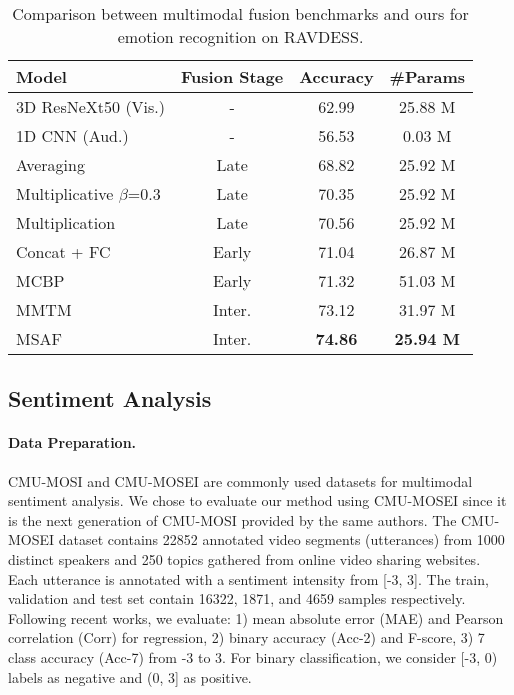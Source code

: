 \documentclass[10pt,twocolumn,letterpaper]{article}
\begin{document}
\begin{table}[t]
  \centering
  \small
    \begin{tabular}{lccc} Model & Fusion Stage & Accuracy & \#Params\\
      \hline
      3D ResNeXt50 (Vis.) & - & 62.99 & 25.88 M\\
      1D CNN (Aud.) & - & 56.53 & 0.03 M\\
      \hline
      Averaging & Late & 68.82 & 25.92 M \\
      Multiplicative $\beta$=0.3 & Late & 70.35 & 25.92 M \\
      Multiplication & Late & 70.56 & 25.92 M \\
      Concat + FC & Early & 71.04 & 26.87 M\\
      MCBP & Early & 71.32 & 51.03 M\\
      MMTM & Inter. & 73.12 & 31.97 M\\
      \hline
      MSAF & Inter. & \textbf{74.86} & \textbf{25.94 M}\\
      \hline
    \end{tabular}
    \caption{Comparison between multimodal fusion benchmarks and ours for emotion recognition on RAVDESS.}
    \label{table1}
\end{table}

\subsection{Sentiment Analysis}
\paragraph{Data Preparation.}
CMU-MOSI \cite{zadeh2016mosi} and CMU-MOSEI \cite{bagher-zadeh-etal-2018-multimodal} are commonly used datasets for multimodal sentiment analysis. We chose to evaluate our method using CMU-MOSEI since it is the next generation of CMU-MOSI provided by the same authors. The CMU-MOSEI dataset contains 22852 annotated video segments (utterances) from 1000 distinct speakers and 250 topics gathered from online video sharing websites. Each utterance is annotated with a sentiment intensity from [-3, 3]. The train, validation and test set contain 16322, 1871, and 4659 samples respectively. Following recent works, we evaluate: 1) mean absolute error (MAE) and Pearson correlation (Corr) for regression, 2) binary accuracy (Acc-2) and F-score, 3) 7 class accuracy (Acc-7) from -3 to 3. For binary classification, we consider [-3, 0) labels as negative and (0, 3] as positive.
\end{document}
